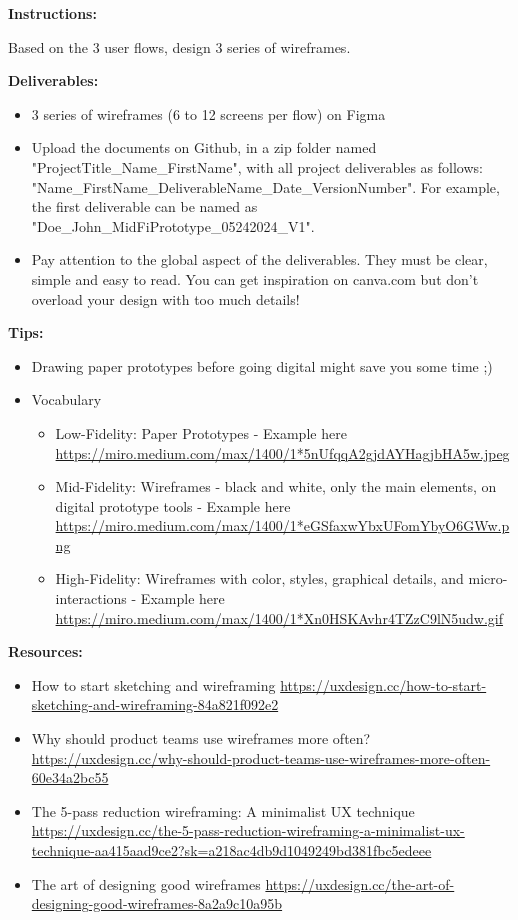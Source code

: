 \makeheaderfiles

\textbf{Instructions:}

Based on the 3 user flows, design 3 series of wireframes.

\textbf{Deliverables:}

\begin{itemize}
\item 3 series of wireframes (6 to 12 screens per flow) on Figma
\item Upload the documents on Github, in a zip folder named "ProjectTitle\_Name\_FirstName", with all project deliverables as follows: "Name\_FirstName\_DeliverableName\_Date\_VersionNumber".  For example, the first deliverable can be named as "Doe\_John\_MidFiPrototype\_05242024\_V1".
\item Pay attention to the global aspect of the deliverables. They must be clear, simple and easy to read. You can get inspiration on canva.com but don't overload your design with too much details!
\end{itemize}

\textbf{Tips:}

\begin{itemize}
\item Drawing paper prototypes before going digital might save you some time ;)
\item Vocabulary
\begin{itemize}
\item Low-Fidelity: Paper Prototypes - Example here \url{https://miro.medium.com/max/1400/1*5nUfqqA2gjdAYHagjbHA5w.jpeg}
\item Mid-Fidelity: Wireframes - black and white, only the main elements, on digital prototype tools - Example here \url{https://miro.medium.com/max/1400/1*eGSfaxwYbxUFomYbyO6GWw.png}
\item High-Fidelity: Wireframes with color, styles, graphical details, and micro-interactions - Example here \url{https://miro.medium.com/max/1400/1*Xn0HSKAvhr4TZzC9lN5udw.gif}
\end{itemize}
\end{itemize}

\textbf{Resources:}

\begin{itemize}
\item How to start sketching and wireframing \url{https://uxdesign.cc/how-to-start-sketching-and-wireframing-84a821f092e2}
\item Why should product teams use wireframes more often? \url{https://uxdesign.cc/why-should-product-teams-use-wireframes-more-often-60e34a2bc55}
\item The 5-pass reduction wireframing: A minimalist UX technique \url{https://uxdesign.cc/the-5-pass-reduction-wireframing-a-minimalist-ux-technique-aa415aad9ce2?sk=a218ac4db9d1049249bd381fbc5edeee}
\item The art of designing good wireframes \url{https://uxdesign.cc/the-art-of-designing-good-wireframes-8a2a9c10a95b}
\end{itemize}

